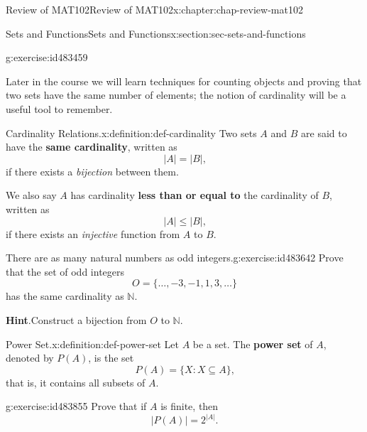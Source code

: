 \documentclass[oneside,10pt,]{book}
\newcommand{\blocktitlefont}{\relax}
\newcommand{\terminology}[1]{\textbf{#1}}
\numberwithin{equation}{section}
\begin{document}
\begin{chapterptx}{Review of MAT102}{}{Review of MAT102}{}{}{x:chapter:chap-review-mat102}
\begin{sectionptx}{Sets and Functions}{}{Sets and Functions}{}{}{x:section:sec-sets-and-functions}
\begin{inlineexercise}{}{g:exercise:id483459}
\end{inlineexercise}
Later in the course we will learn techniques for counting objects and proving that two sets have the same number of elements; the notion of cardinality will be a useful tool to remember.%
\begin{definition}{Cardinality Relations.}{x:definition:def-cardinality}%
\label{g:notation:id483473}\label{g:notation:id483515} Two sets \(A\) and \(B\) are said to have the \terminology{same cardinality}, written as%
\begin{equation*}
|A| = |B|\text{,}
\end{equation*}
if there exists a \emph{bijection} between them.%
\par
We also say \(A\) has cardinality \terminology{less than or equal to} the cardinality of \(B\), written as%
\begin{equation*}
|A| \leq |B|\text{,}
\end{equation*}
if there exists an \emph{injective} function from \(A\) to \(B\).%
\end{definition}
\begin{inlineexercise}{There are as many natural numbers as odd integers.}{g:exercise:id483642}%
Prove that the set of odd integers%
\begin{equation*}
O = \{\ldots,-3,-1,1,3,\ldots\}
\end{equation*}
has the same cardinality as \(\mathbb{N}\).%
\par\smallskip%
\noindent\textbf{\blocktitlefont Hint}.\hypertarget{g:hint:id483683}{}\quad{}Construct a bijection from \(O\) to \(\mathbb{N}\).%
\end{inlineexercise}
\begin{definition}{Power Set.}{x:definition:def-power-set}%
\label{g:notation:id483696} Let \(A\) be a set. The \terminology{power set} of \(A\), denoted by \(P(A)\), is the set%
\begin{equation*}
P(A) = \{X : X \subseteq A\}\text{,}
\end{equation*}
that is, it contains all subsets of \(A\).%
\end{definition}
\begin{inlineexercise}{}{g:exercise:id483855}%
Prove that if \(A\) is finite, then%
\begin{equation*}
|P(A)| = 2^{|A|}\text{.}
\end{equation*}
%
\end{inlineexercise}
\end{sectionptx}
%
%
\typeout{************************************************}

\end{chapterptx}
\end{document}
